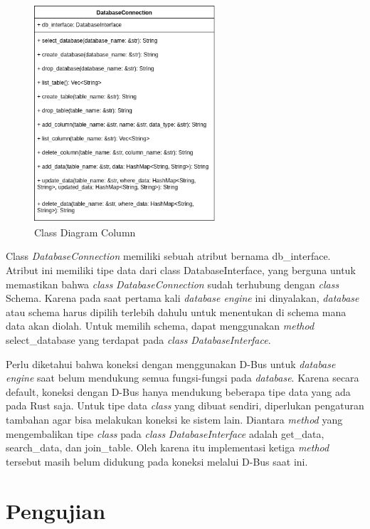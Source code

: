 \begin{figure}[H]
  \centering{}
	\includegraphics[width=0.6\textwidth]{gambar/bab4/DatabaseConnection}
  \caption{Class Diagram Column}
\end{figure}

Class \emph{DatabaseConnection} memiliki sebuah atribut bernama db\_interface. Atribut ini memiliki tipe data dari class
DatabaseInterface, yang berguna untuk memastikan bahwa \emph{class} \emph{DatabaseConnection} sudah terhubung dengan \emph{class} Schema.
Karena pada saat pertama kali \emph{database engine} ini dinyalakan, \emph{database} atau schema harus dipilih terlebih dahulu untuk
menentukan di schema mana data akan diolah. Untuk memilih schema, dapat menggunakan \emph{method} select\_database yang terdapat
pada \emph{class} \emph{DatabaseInterface}.

Perlu diketahui bahwa koneksi dengan menggunakan D-Bus untuk \emph{database engine} saat belum mendukung semua fungsi-fungsi pada \emph{database}. Karena secara default, 
koneksi dengan D-Bus hanya mendukung beberapa tipe data yang ada pada Rust saja. Untuk tipe data \emph{class} yang dibuat sendiri, diperlukan pengaturan tambahan agar bisa
melakukan koneksi ke sistem lain. Diantara \emph{method} yang mengembalikan tipe \emph{class} pada \emph{class} \emph{DatabaseInterface} adalah get\_data, search\_data, dan join\_table.
Oleh karena itu implementasi ketiga \emph{method} tersebut masih belum didukung pada koneksi melalui D-Bus saat ini.

\section{Pengujian}

